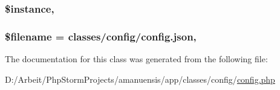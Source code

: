 \subsubsection[{\$instance}]{\setlength{\rightskip}{0pt plus 5cm}\$instance\hspace{0.3cm}{\ttfamily [static]}, {\ttfamily [protected]}}\label{class_config_ad9d7ce33ebb142b70e58b68052ca0ea8}
\hypertarget{class_config_a0722441477f957078ee2437054556cbc}{}
\subsubsection[{\$filename}]{\setlength{\rightskip}{0pt plus 5cm}\$filename = \textquotesingle{}classes/config/config.\+json\textquotesingle{}\hspace{0.3cm}{\ttfamily [static]}, {\ttfamily [private]}}\label{class_config_a0722441477f957078ee2437054556cbc}


The documentation for this class was generated from the following file\+:\begin{DoxyCompactItemize}
\item 
D\+:/\+Arbeit/\+Php\+Storm\+Projects/amanuensis/app/classes/config/\hyperlink{config_8php}{config.\+php}\end{DoxyCompactItemize}
